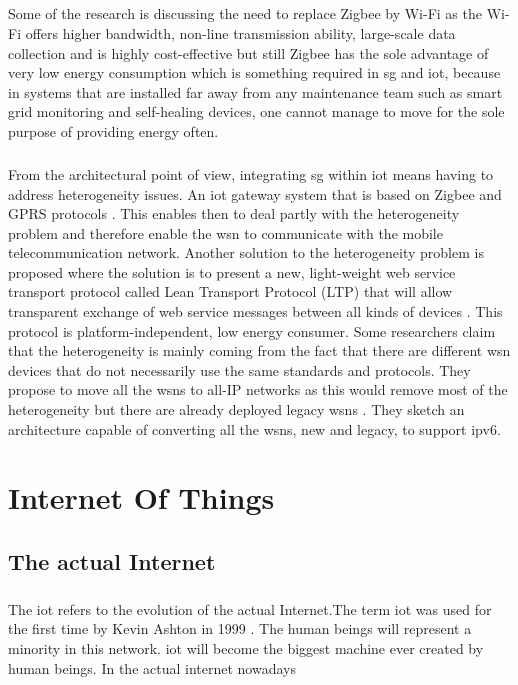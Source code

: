 \documentclass[oneside,12pt,a4paper,final]{book}
\begin{document}
\paragraph{}
Some of the research is discussing the need to replace Zigbee by Wi-Fi as the Wi-Fi offers higher bandwidth, non-line transmission ability, large-scale data collection and is highly cost-effective \cite{ref10} but still Zigbee has the sole advantage of very low energy consumption which is something required in \gls{sg} and \gls{iot}, because in systems that are installed far away from any maintenance team such as smart grid monitoring and self-healing devices, one cannot manage to move for the sole purpose of providing energy often. 
\paragraph{}
From the architectural point of view, integrating \gls{sg} within \gls{iot} means having to address heterogeneity issues. An \gls{iot} gateway system that is based on Zigbee and GPRS protocols \cite{ref11}. This enables then to deal partly with the heterogeneity problem and therefore enable the \gls{wsn} to communicate with the mobile telecommunication network. Another solution to the heterogeneity problem is proposed where the solution is to present a new, light-weight web service transport protocol called Lean Transport Protocol (LTP) that will allow transparent exchange of web service messages between all kinds of devices \cite{ref12}. This protocol is platform-independent, low energy consumer. Some researchers claim that the heterogeneity is mainly coming from the fact that there are different \gls{wsn} devices that do not necessarily use the same standards and protocols. They propose to move all the \glspl{wsn} to all-IP networks as this would remove most of the heterogeneity but there are already deployed legacy \glspl{wsn} \cite{ref13}. They sketch an architecture capable of converting all the \glspl{wsn}, new and legacy, to support \gls{ipv6}.


\chapter{Internet Of Things}
\section{The actual Internet}
\paragraph{}
The \gls{iot} refers to the evolution of the actual Internet.The term \gls{iot} was used for the first time by Kevin Ashton in 1999 \cite{ref17}. The human beings will represent a minority in this network. \gls{iot} will become the biggest machine ever created by human beings. In the actual internet nowadays
\end{document}
